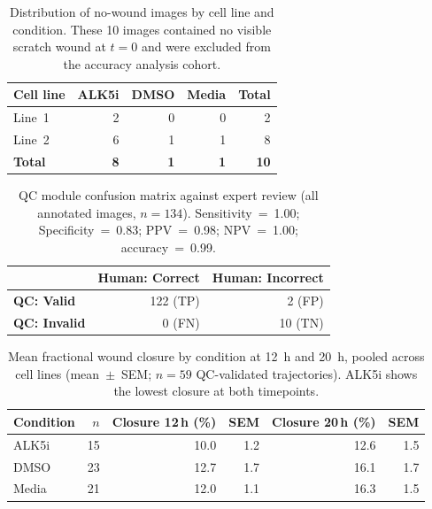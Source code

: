 \begin{table}[H]
\centering
\caption{Distribution of no-wound images by cell line and condition.
  These 10 images contained no visible scratch wound at $t = 0$ and were excluded
  from the accuracy analysis cohort.}
\label{tab:supp-nowound-distribution}
\begin{tabular}{lrrrr}
\toprule
Cell line & ALK5i & DMSO & Media & Total \\
\midrule
Line~1 & 2 & 0 & 0 & 2 \\
Line~2 & 6 & 1 & 1 & 8 \\
\midrule
\textbf{Total} & \textbf{8} & \textbf{1} & \textbf{1} & \textbf{10} \\
\bottomrule
\end{tabular}
\end{table}

\begin{table}[H]
\centering
\caption{QC module confusion matrix against expert review (all annotated images,
  $n = 134$). Sensitivity~=~1.00; Specificity~=~0.83; PPV~=~0.98; NPV~=~1.00;
  accuracy~=~0.99.}
\label{tab:supp-qc-confusion}
\begin{tabular}{lrr}
\toprule
 & Human: Correct & Human: Incorrect \\
\midrule
\textbf{QC: Valid}   & 122 (TP) & 2 (FP) \\
\textbf{QC: Invalid} & 0 (FN)   & 10 (TN) \\
\bottomrule
\end{tabular}
\end{table}

\begin{table}[H]
\centering
\caption{Mean fractional wound closure by condition at 12~h and 20~h, pooled across
  cell lines (mean~$\pm$~SEM; $n = 59$ QC-validated trajectories).
  ALK5i shows the lowest closure at both timepoints.}
\label{tab:supp-closure}
\begin{tabular}{lrrrrr}
\toprule
Condition & $n$ & Closure 12\,h (\%) & SEM & Closure 20\,h (\%) & SEM \\
\midrule
ALK5i & 15 & 10.0 & 1.2 & 12.6 & 1.5 \\
DMSO  & 23 & 12.7 & 1.7 & 16.1 & 1.7 \\
Media & 21 & 12.0 & 1.1 & 16.3 & 1.5 \\
\bottomrule
\end{tabular}
\end{table}

